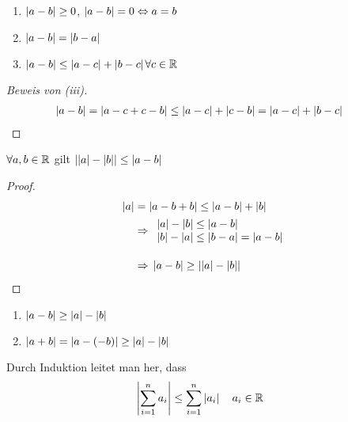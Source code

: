 \begin{satz}
    \label{satz:diff-abs}
    \theoremescape
    \begin{enumerate}[label=(\roman*)]
        \item $\left|a-b\right|\geq 0$, $\left|a-b\right| = 0\Leftrightarrow{} a = b$
        \item $\left|a-b\right| = \left|b-a\right|$
        \item $\left|a-b\right|\leq \left|a-c\right| + \left|b-c\right|$\quad $\forall c\in\mathbb{R}$ %
    \end{enumerate}
    \begin{proof}[Beweis von (iii)]
        \begin{align*}
            \left|a-b\right| &= \left|a-c+c-b\right| \leq \left|a-c\right|+\left|c-b\right| = \left|a-c\right|+\left|b-c\right|\qedhere
        \end{align*}
    \end{proof}
\end{satz}

\begin{satz} %
    $\forall a,b\in\mathbb{R}$ gilt $\left|\left|a\right|-\left|b\right|\right|\leq\left|a-b\right|$
    \begin{proof}
        \begin{align*}
            \left|a\right| &= \left|a-b+b\right| \leq \left|a-b\right| + \left|b\right|\\
            &\Rightarrow{}
            \begin{array}{l}
                \left|a\right|-\left|b\right| \leq \left|a-b\right| \\
                \left|b\right|-\left|a\right| \leq \left|b-a\right| = \left|a-b\right|
            \end{array}
            \\[10pt]
            &\Rightarrow{} \left|a-b\right|\geq\left|\left|a\right|-\left|b\right|\right|\qedhere
        \end{align*}
    \end{proof}
\end{satz}

\begin{folgerung}
    \theoremescape
    \begin{enumerate}[label=(\roman*)]
        \item $\left|a-b\right|\geq \left|a\right|-\left|b\right|$
        \item $\left|a+b\right| = \left|a-\left(-b\right)\right| \geq \left|a\right| - \left|b\right|$
    \end{enumerate}
\end{folgerung}

\begin{bemerkung}
    Durch Induktion leitet man her, dass
    \begin{align*}
        \left|\sum_{i=1}^{n} a_i\right| &\leq \sum_{i=1}^{n} \left|a_i\right|\quad a_i \in\mathbb{R}
    \end{align*}
\end{bemerkung}

\newpage